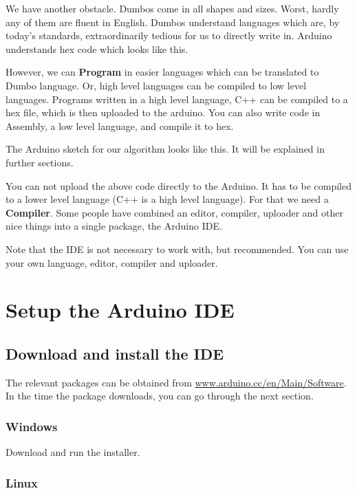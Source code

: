 \documentclass{article}
\begin{document}
	We have another obstacle. Dumbos come in all shapes and sizes. Worst, hardly any of them are fluent in English. Dumbos understand languages which are, by today's standards, extraordinarily tedious for us to directly write in. Arduino understands hex code which looks like this.

	

	However, we can \textbf{Program} in easier languages which can be translated to Dumbo language. Or, high level languages can be compiled to low level languages. Programs written in a high level language, C++ can be compiled to a hex file, which is then uploaded to the arduino. You can also write code in Assembly, a low level language, and compile it to hex.

	The Arduino sketch for our algorithm looks like this. It will be explained in further sections.

	

	You can not upload the above code directly to the Arduino. It has to be compiled to a lower level language (C++ is a high level language). For that we need a \textbf{Compiler}. Some people have combined an editor, compiler, uploader and other nice things into a single package, the Arduino IDE\@.

	Note that the IDE is not necessary to work with, but recommended. You can use your own language, editor, compiler and uploader.

\section{Setup the Arduino IDE}

	\subsection{Download and install the IDE}

		The relevant packages can be obtained from \url{www.arduino.cc/en/Main/Software}. In the time the package downloads, you can go through the next section.

		\subsubsection{Windows}
			Download and run the installer.

		\subsubsection{Linux}
\end{document}

